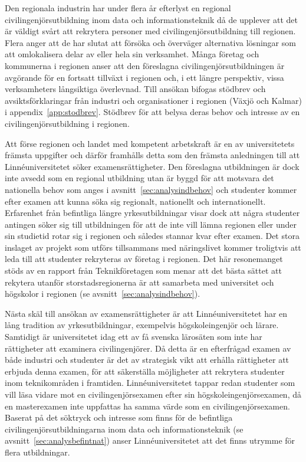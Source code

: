 Den regionala industrin har under flera år efterlyst en regional civilingenjörsutbildning inom data och informationsteknik då de upplever att det är väldigt svårt att rekrytera personer med civilingenjörsutbildning till regionen. Flera anger att de har slutat att försöka och överväger alternativa lösningar som att omlokalisera delar av eller hela sin verksamhet. Många företag och kommunerna i regionen anser att den föreslagna civilingenjörsutbildningen är avgörande för en fortsatt tillväxt i regionen och, i ett längre perspektiv, vissa verksamheters långsiktiga överlevnad. Till ansökan bifogas stödbrev och avsiktsförklaringar från industri och organisationer i regionen (Växjö och Kalmar) i appendix~\ref{app:stodbrev}. Stödbrev för att belysa deras behov och intresse av en civilingenjörsutbildning i regionen.

Att förse regionen och landet med kompetent arbetskraft är en av universitetets främsta uppgifter och därför framhålls detta som den främsta anledningen till att Linnéuniversitetet söker examensrättigheter. Den föreslagna utbildningen är dock inte avsedd som en regional utbildning utan är byggd för att motsvara det nationella behov som anges i avsnitt~\ref{sec:analysindbehov} och studenter kommer efter examen att kunna söka sig regionalt, nationellt och internationellt. Erfarenhet från befintliga längre yrkesutbildningar visar dock att några studenter antingen söker sig till utbildningen för att de inte vill lämna regionen eller under sin studietid rotar sig i regionen och således stannar kvar efter examen. Det stora inslaget av projekt som utförs tillsammans med näringslivet kommer troligtvis att leda till att studenter rekryteras av företag i regionen. Det här resonemanget stöds av en rapport från Teknikföretagen som menar att det bästa sättet att rekytera utanför storstadsregionerna är att samarbeta med universitet och högskolor i regionen (se avsnitt~\ref{sec:analysindbehov}).

Nästa skäl till ansökan av examensrättigheter är att Linnéuniversitetet har en lång tradition av yrkesutbildningar, exempelvis högskoleingenjör och lärare. Samtidigt är universitetet idag ett av få svenska lärosäten som inte har rättigheter att examinera civilingenjörer. Då detta är en efterfrågad examen av både industri och studenter är det av strategisk vikt att erhålla rättigheter att erbjuda denna examen, för att säkerställa möjligheter att rekrytera studenter inom teknikområden i framtiden. Linnéuniversitetet tappar redan studenter som vill läsa vidare mot en civilingenjörsexamen efter sin högskoleingenjörsexamen, då en masterexamen inte uppfattas ha samma värde som en civilingenjörsexamen. Baserat på det söktryck och intresse som finns för de befintliga civilingenjörsutbildningarna inom data och informationsteknik (se avsnitt~\ref{sec:analysbefintnat}) anser Linnéuniversitetet att det finns utrymme för flera utbildningar.

